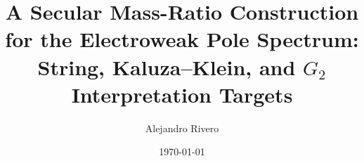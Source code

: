 \documentclass[aps,prd,reprint,nofootinbib,superscriptaddress]{revtex4-2}
\begin{document}
\title{A Secular Mass-Ratio Construction for the Electroweak Pole Spectrum: String, Kaluza--Klein, and \texorpdfstring{\(G_2\)}{G2} Interpretation Targets}

\author{Alejandro Rivero}

\date{\today}

\begin{abstract}

\end{abstract}

\maketitle


















\appendix





\end{document}
